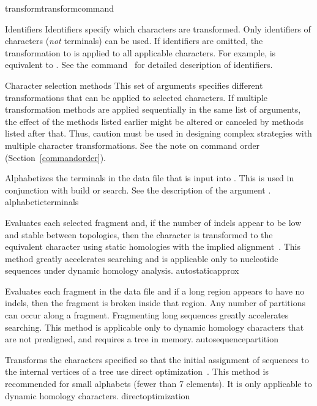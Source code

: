 \begin{command}{transform}{transformcommand}
\begin{arguments}
\begin{argumentgroup}{Identifiers}
Identifiers specify which characters are transformed. Only
identifiers of characters (\emph{not} terminals) can be used. If
identifiers are omitted, the transformation to is applied to all
applicable characters. For example,
 is equivalent to
. See the command~
for detailed description of identifiers.
\end{argumentgroup}

\begin{argumentgroup}{Character selection methods}
This set of arguments specifies different transformations that can be applied
to selected characters. If multiple transformation methods are applied
sequentially in the same list of arguments, the effect of the methods listed
earlier might be altered or canceled by methods listed after that. Thus, caution
must be used in designing complex strategies with multiple character
transformations. See the note on command order (Section~\ref{commandorder}).

{Alphabetizes the terminals in the data file that is input into \poy. This is used in 
conjunction with build or search. See the description of the argument 
.}
{alphabeticterminals}

{Evaluates each selected fragment and, if the number of indels
appear to be low and stable between topologies, then the character
is transformed to the equivalent character using static homologies
with the implied alignment~\cite{wheeler2003}.
This method greatly accelerates searching and is applicable only to 
nucleotide sequences under dynamic homology analysis.}
{autostaticapprox}

{Evaluates each fragment in the data file and if a long region appears 
to have no indels, then the fragment is broken inside that region.
Any number of partitions can occur along a fragment. Fragmenting
long sequences greatly accelerates searching. This method is
applicable only to dynamic homology characters that are not prealigned, 
and requires a tree in memory.}
{autosequencepartition}

{Transforms the characters specified so that the initial assignment of sequences to 
the internal vertices of a tree use direct
optimization~\cite{wheeler1996}. This method is recommended for small
alphabets (fewer than 7 elements). It is only applicable to dynamic homology
characters.}
{directoptimization}


\end{argumentgroup}
\end{arguments}
\end{command}

